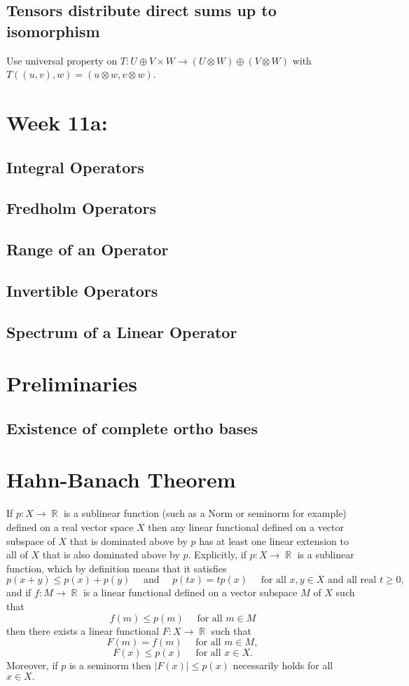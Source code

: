 \documentclass{article}
\DeclareMathOperator\R{\mathbb{R}}
\DeclareMathOperator\op{\oplus}
\DeclareMathOperator\ot{\otimes}
\begin{document}
\subsection*{Tensors distribute direct sums up to isomorphism}
Use universal property on $T: U \op V \times W \to (U \ot W) \op (V \ot W)$ with $T((u,v),w) = (u \ot w,v \ot w)$.
\section*{Week 11a: }
\subsection*{Integral Operators}
\subsection*{Fredholm Operators}
\subsection*{Range of an Operator}
\subsection*{Invertible Operators}
\subsection*{Spectrum of a Linear Operator}
\section*{Preliminaries}
\subsection*{Existence of complete ortho bases}
\newpage{}
\section*{Hahn-Banach Theorem}
If $p : X \to \R$ is a sublinear function (such as a Norm or seminorm for example) defined
on a real vector space $X$ then any linear functional defined on a vector
subspace of $X$ that is dominated above by $p$ has at
least one linear extension to all of $X$ that is also dominated above by $p.$
Explicitly, if $p : X \to \R$ is a sublinear function,
which by definition means that it satisfies
$$p(x + y) \leq p(x) + p(y) \quad \text{ and } \quad p(t x) = t p(x) \quad \text{ for all } x, y \in X \text{ and all real } t \geq 0,$$
and if $f : M \to \R$ is a linear functional defined on a vector subspace $M$ of $X$ such that
$$f(m) \leq p(m) \quad \text{ for all } m \in M$$
then there exists a linear functional $F : X \to \R$ such that
$$F(m) = f(m) \quad \text{ for all } m \in M,$$
$$F(x) \leq p(x) \quad \text{ for all } x \in X.$$
Moreover, if $p$ is a seminorm then $|F(x)| \leq p(x)$ necessarily holds for all $x \in X.$
\end{document}
